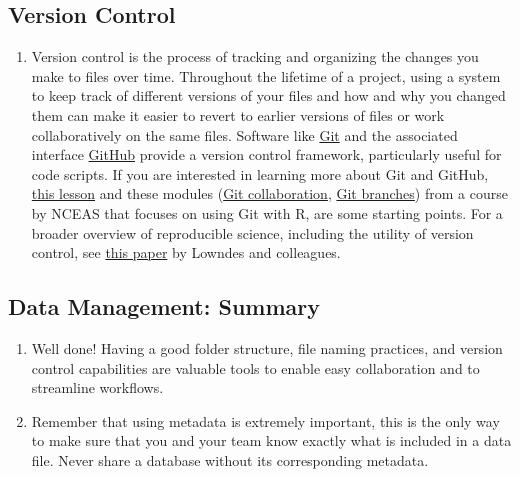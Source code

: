 \documentclass[
]{book}
\providecommand{\tightlist}{%
  \setlength{\itemsep}{0pt}\setlength{\parskip}{0pt}}
\begin{document}
\hypertarget{version-control}{%
\subsection{Version Control}\label{version-control}}

\begin{enumerate}
\def\labelenumi{\arabic{enumi}.}
\tightlist
\item
  Version control is the process of tracking and organizing the changes you make to files over time. Throughout the lifetime of a project, using a system to keep track of different versions of your files and how and why you changed them can make it easier to revert to earlier versions of files or work collaboratively on the same files. Software like \href{https://git-scm.com}{Git} and the associated interface \href{https://github.com}{GitHub} provide a version control framework, particularly useful for code scripts. If you are interested in learning more about Git and GitHub, \href{https://learning.nceas.ucsb.edu/2021-11-RRCourse/version-control-with-git-and-github.html}{this lesson} and these modules (\href{https://learning.nceas.ucsb.edu/2021-11-RRCourse/git-collaboration-and-conflict-management.html}{Git collaboration}, \href{https://learning.nceas.ucsb.edu/2021-11-RRCourse/git-pull-requests-and-branches.html}{Git branches}) from a course by NCEAS that focuses on using Git with R, are some starting points. For a broader overview of reproducible science, including the utility of version control, see \href{https://www.nature.com/articles/s41559-017-0160}{this paper} by Lowndes and colleagues.
\end{enumerate}

\hypertarget{data-management-summary}{%
\subsection{Data Management: Summary}\label{data-management-summary}}

\begin{enumerate}
\def\labelenumi{\arabic{enumi}.}
\item
  Well done! Having a good folder structure, file naming practices, and version control capabilities are valuable tools to enable easy collaboration and to streamline workflows.
\item
  Remember that using metadata is extremely important, this is the only way to make sure that you and your team know exactly what is included in a data file. Never share a database without its corresponding metadata.
\end{enumerate}
\end{document}
